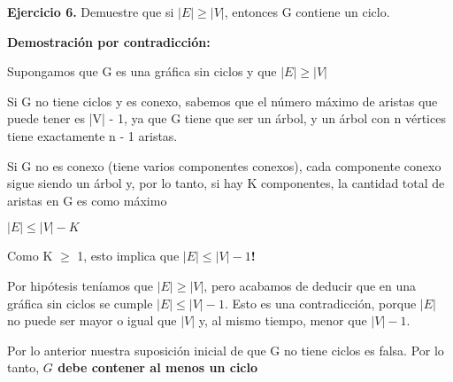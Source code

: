 \textbf{Ejercicio 6.} Demuestre que si $|E|\geq |V|$, entonces G contiene un ciclo.

\textbf{Demostración por contradicción:}

Supongamos que G es una gráfica sin ciclos y que $|E|\geq |V|$

Si G no tiene ciclos y es conexo, sabemos que el número máximo de aristas que puede tener es |V| - 1, ya que G tiene que ser un árbol, y un árbol con n vértices tiene exactamente n - 1 aristas.

Si G no es conexo (tiene varios componentes conexos), cada componente conexo sigue siendo un árbol y, por lo tanto, si hay K componentes, la cantidad total de aristas en G es como máximo

$|E| \leq |V| - K$

Como K $\geq$ 1, esto implica que $|E| \leq |V| - 1$\textbf{!}

Por hipótesis teníamos que $|E|\geq |V|$, pero acabamos de deducir que en una gráfica sin ciclos se cumple $|E| \leq |V| - 1$. Esto es una contradicción, porque $|E|$ no puede ser mayor o igual que $|V|$ y, al mismo tiempo, menor que $|V|-1$.

Por lo anterior nuestra suposición inicial de que G no tiene ciclos es falsa. Por lo tanto, \textbf{$G$ debe contener al menos un ciclo}

\QED

